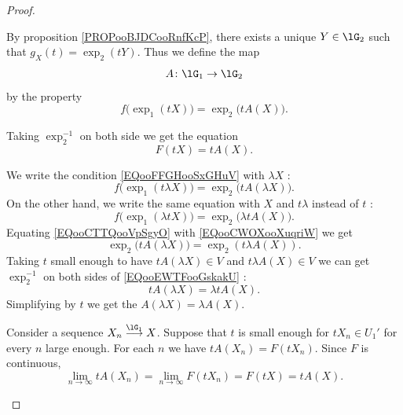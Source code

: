 \begin{proof}
\begin{subproof}
		By proposition \ref{PROPooBJDCooRnfKcP}, there exists a unique \( Y\in \lG_2\) such that \( g_X(t)=\exp_2(tY)\). Thus we define the map
		\begin{equation}
			A \colon \lG_1\to \lG_2
		\end{equation}
		by the property
		\begin{equation}		\label{EQooFFGHooSxGHuV}
			f\big( \exp_1(tX) \big)=\exp_2\big( tA(X) \big).
		\end{equation}

		Taking \( \exp_2^{-1}\) on both side we get the equation
		\begin{equation}		\label{EQooPXGVooLhbXfK}
			F(tX)=tA(X).
		\end{equation}

		\spitem[\( A(\lambda X)=\lambda A(X)\)]
		We write the condition \eqref{EQooFFGHooSxGHuV} with \( \lambda X\) :
		\begin{equation}		\label{EQooCTTQooVpSgyO}
			f\big( \exp_1(t\lambda X) \big)=\exp_2\big( tA(\lambda X) \big).
		\end{equation}
		On the other hand, we write the same equation with \( X\) and \( t\lambda\) instead of \( t\) :
		\begin{equation}		\label{EQooCWOXooXuqriW}
			f\big( \exp_1(\lambda t X) \big)=\exp_2\big( \lambda t A(X) \big).
		\end{equation}
		Equating \eqref{EQooCTTQooVpSgyO} with \eqref{EQooCWOXooXuqriW} we get
		\begin{equation}		\label{EQooEWTFooGskakU}
			\exp_2\big( t A(\lambda X) \big)=\exp_2(t\lambda A(X)).
		\end{equation}
		Taking \( t\) small enough to have \( t A(\lambda X)\in V\) and \( t\lambda A(X)\in V\) we can get \( \exp_2^{-1}\) on both sides of \eqref{EQooEWTFooGskakU} :
		\begin{equation}
			t A(\lambda X)=\lambda tA(X).
		\end{equation}
		Simplifying by \( t\) we get the \( A(\lambda X)=\lambda A(X)\).

		\spitem[\( A\) is continuous]
		Consider a sequence \( X_n\stackrel{ \lG_1}{\longrightarrow} X\). Suppose that \( t\) is small enough for \( tX_n\in U_1'\) for every \( n\) large enough. For each \( n\) we have \( tA(X_n)=F(tX_n)\). Since \( F\) is continuous,
		\begin{equation}
			\lim_{n\to \infty}tA(X_n)=\lim_{n\to\infty}F(tX_n)=F(tX)=tA(X).
		\end{equation}


\end{subproof}
\end{proof}
